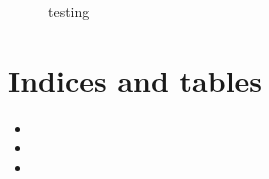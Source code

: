 \documentclass[a4paper,10pt,english,openany, oneside]{sphinxmanual}
\begin{document}
\begin{figure}[htbp]
\centering
\capstart

\noindent{}
\caption{testing}\label{\detokenize{test:id1}}\end{figure}


\chapter{Indices and tables}
\label{\detokenize{index:indices-and-tables}}\begin{itemize}
\item {} 
\sphinxAtStartPar
{}

\item {} 
\sphinxAtStartPar
{}

\item {} 
\sphinxAtStartPar
{}

\end{itemize}


\renewcommand{\indexname}{Python Module Index}
\begin{sphinxtheindex}
\let\bigletter\sphinxstyleindexlettergroup
\bigletter{t}
\item\relax{}
\end{sphinxtheindex}

\renewcommand{\indexname}{Index}
\printindex
\end{document}
